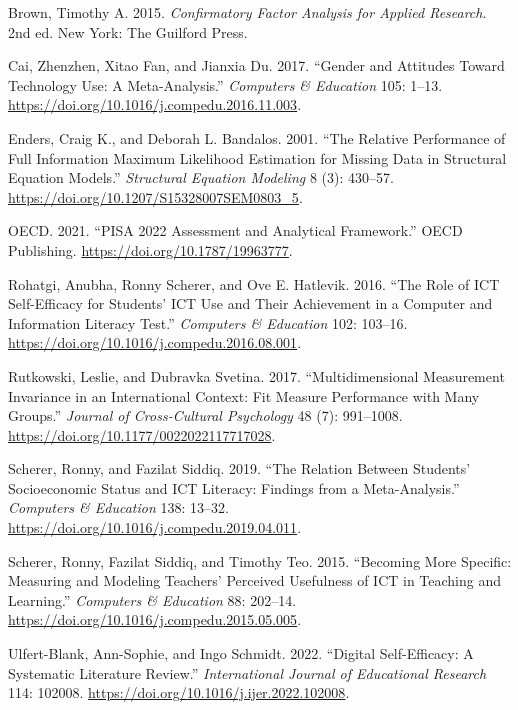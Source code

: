 \documentclass[
  letterpaper,
  DIV=11,
  numbers=noendperiod]{scrartcl}
\newlength{\cslhangindent}
\newenvironment{CSLReferences}[2] %
 {\begin{list}{}{%
  \setlength{\itemindent}{0pt}
  \setlength{\leftmargin}{0pt}
  \setlength{\parsep}{0pt}
  \ifodd #1
   \setlength{\leftmargin}{\cslhangindent}
   \setlength{\itemindent}{-1\cslhangindent}
  \fi
  \setlength{\itemsep}{#2\baselineskip}}}
 {\end{list}}
\begin{document}
\label{refs}
\begin{CSLReferences}{1}{0}
Brown, Timothy A. 2015. \emph{Confirmatory Factor Analysis for Applied
Research}. 2nd ed. New York: The Guilford Press.

Cai, Zhenzhen, Xitao Fan, and Jianxia Du. 2017. {``Gender and Attitudes
Toward Technology Use: A Meta-Analysis.''} \emph{Computers \& Education}
105: 1--13. \url{https://doi.org/10.1016/j.compedu.2016.11.003}.

Enders, Craig K., and Deborah L. Bandalos. 2001. {``The Relative
Performance of Full Information Maximum Likelihood Estimation for
Missing Data in Structural Equation Models.''} \emph{Structural Equation
Modeling} 8 (3): 430--57.
\url{https://doi.org/10.1207/S15328007SEM0803_5}.

OECD. 2021. {``PISA 2022 Assessment and Analytical Framework.''} OECD
Publishing. \url{https://doi.org/10.1787/19963777}.

Rohatgi, Anubha, Ronny Scherer, and Ove E. Hatlevik. 2016. {``The Role
of ICT Self-Efficacy for Students' ICT Use and Their Achievement in a
Computer and Information Literacy Test.''} \emph{Computers \& Education}
102: 103--16. \url{https://doi.org/10.1016/j.compedu.2016.08.001}.

Rutkowski, Leslie, and Dubravka Svetina. 2017. {``Multidimensional
Measurement Invariance in an International Context: Fit Measure
Performance with Many Groups.''} \emph{Journal of Cross-Cultural
Psychology} 48 (7): 991--1008.
\url{https://doi.org/10.1177/0022022117717028}.

Scherer, Ronny, and Fazilat Siddiq. 2019. {``The Relation Between
Students' Socioeconomic Status and ICT Literacy: Findings from a
Meta-Analysis.''} \emph{Computers \& Education} 138: 13--32.
\url{https://doi.org/10.1016/j.compedu.2019.04.011}.

Scherer, Ronny, Fazilat Siddiq, and Timothy Teo. 2015. {``Becoming More
Specific: Measuring and Modeling Teachers' Perceived Usefulness of ICT
in Teaching and Learning.''} \emph{Computers \& Education} 88: 202--14.
\url{https://doi.org/10.1016/j.compedu.2015.05.005}.

Ulfert-Blank, Ann-Sophie, and Ingo Schmidt. 2022. {``Digital
Self-Efficacy: A Systematic Literature Review.''} \emph{International
Journal of Educational Research} 114: 102008.
\url{https://doi.org/10.1016/j.ijer.2022.102008}.

\end{CSLReferences}
\end{document}
